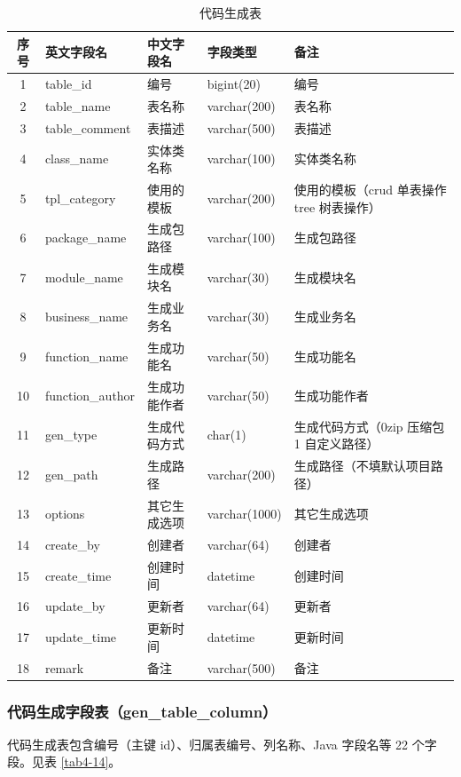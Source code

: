 \documentclass{izdthesis}
\begin{document}
\begin{table}[H]
  \centering
  \caption{代码生成表}
  \label{tab4-13}
  \songti
  \begin{tabular}{c l l l p{4.5cm}}
    \toprule
    序号 & 英文字段名 & 中文字段名 & 字段类型 & 备注 \\
    \midrule
    1 & table\_id & 编号 & bigint(20) & 编号 \\
    2 & table\_name & 表名称 & varchar(200) & 表名称 \\
    3 & table\_comment & 表描述 & varchar(500) & 表描述 \\
    4 & class\_name & 实体类名称 & varchar(100) & 实体类名称 \\
    5 & tpl\_category & 使用的模板 & varchar(200) & 使用的模板（crud 单表操作 tree 树表操作） \\
    6 & package\_name & 生成包路径 & varchar(100) & 生成包路径 \\
    7 & module\_name & 生成模块名 & varchar(30) & 生成模块名 \\
    8 & business\_name & 生成业务名 & varchar(30) & 生成业务名 \\
    9 & function\_name & 生成功能名 & varchar(50) & 生成功能名 \\
    10 & function\_author & 生成功能作者 & varchar(50) & 生成功能作者 \\
    11 & gen\_type & 生成代码方式 & char(1) & 生成代码方式（0zip 压缩包 1 自定义路径） \\
    12 & gen\_path & 生成路径 & varchar(200) & 生成路径（不填默认项目路径） \\
    13 & options & 其它生成选项 & varchar(1000) & 其它生成选项 \\
    14 & create\_by & 创建者 & varchar(64) & 创建者 \\
    15 & create\_time & 创建时间 & datetime & 创建时间 \\
    16 & update\_by & 更新者 & varchar(64) & 更新者 \\
    17 & update\_time & 更新时间 & datetime & 更新时间 \\
    18 & remark & 备注 & varchar(500) & 备注 \\
    \bottomrule
  \end{tabular}
\end{table}

\subsubsection{代码生成字段表（gen\_table\_column）}
代码生成表包含编号（主键 id）、归属表编号、列名称、Java 字段名等 22 个字段。见表 \ref{tab4-14}。
\end{document}
